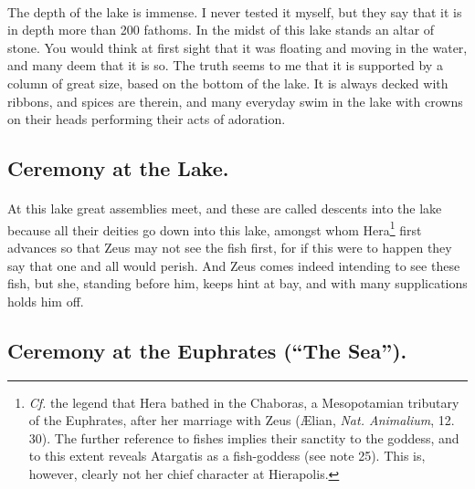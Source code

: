 \documentclass[a4paper, 11pt, oneside, polutonikogreek, english]{article}
\begin{document}
\paragraph{}
The depth of the lake is immense. I never tested it myself, but they say that it is in depth more than 200 fathoms. In the midst of this lake stands an altar of stone. You would think at first sight that it was floating and moving in the water, and many deem that it is so. The truth seems to me that it is supported by a column of great size, based on the bottom of the lake. It is always decked with ribbons, and spices are therein, and many everyday swim in the lake with crowns on their heads performing their acts of adoration.

\subsection{Ceremony at the Lake.}
\paragraph{}
At this lake great assemblies meet, and these are called descents into the lake because all their deities go down into this lake, amongst whom Hera\footnote{\emph{Cf.} the legend that Hera bathed in the Chaboras, a Mesopotamian tributary of the Euphrates, after her marriage with Zeus (Ælian, \emph{Nat. Animalium}, 12. 30). The further reference to fishes implies their sanctity to the goddess, and to this extent reveals Atargatis as a fish-goddess (see note 25). This is, however, clearly not her chief character at Hierapolis.} first advances so that Zeus may not see the fish first, for if this were to happen they say that one and all would perish. And Zeus comes indeed intending to see these fish, but she, standing before him, keeps hint at bay, and with many supplications holds him off.

\subsection{Ceremony at the Euphrates (``The Sea'').}
\end{document}
